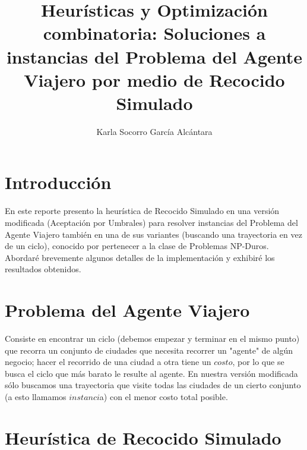 \documentclass[a4paper]{article}
\title{Heurísticas y Optimización combinatoria: Soluciones a instancias del Problema del Agente Viajero por medio de Recocido Simulado}
\author{Karla Socorro García Alcántara}
\begin{document}
\maketitle


\section{Introducción}

En este reporte presento la heurística de Recocido Simulado en una versión modificada (Aceptación por Umbrales) para resolver instancias del Problema del Agente Viajero también en una de sus variantes (buscando una trayectoria en vez de un ciclo), conocido por pertenecer a la clase de Problemas NP-Duros. Abordaré brevemente algunos detalles de la implementación y exhibiré los resultados obtenidos.

\section{Problema del Agente Viajero}
Consiste en encontrar un ciclo (debemos empezar y terminar en el mismo punto) que recorra un conjunto de ciudades que necesita recorrer un "agente" de algún negocio; hacer el recorrido de una ciudad a otra tiene un $costo$, por lo que se busca el ciclo que más barato le resulte al agente.
En nuestra versión modificada sólo buscamos una trayectoria que visite todas las ciudades de un cierto conjunto (a esto llamamos $instanci$a) con el menor costo total posible.

\section{Heurística de Recocido Simulado}
\end{document}

